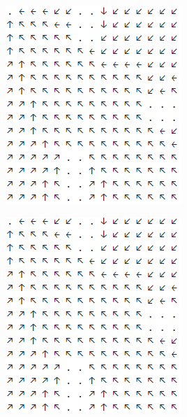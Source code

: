 \documentclass[12pt, a4paper]{article}
\begin{document}
\begin{figure}[h]
\begin{subfigure}{0.45\linewidth}
        \includegraphics[width=\linewidth]{images/q4/d/base/discount_75.png}
        \caption{}
    \end{subfigure}
    \newline
    \begin{subfigure}{0.45\linewidth}
        \centering
        \includegraphics[width=\linewidth]{images/q4/d/base/discount_05.png}

\end{subfigure}
\end{figure}
\end{document}
